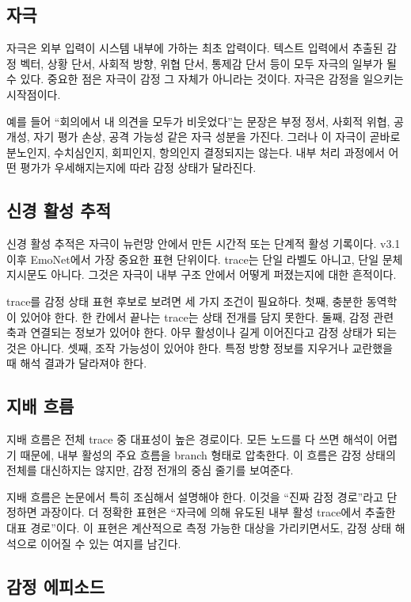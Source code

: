\documentclass[11pt,a4paper]{article}
\begin{document}
\subsection{자극}

자극은 외부 입력이 시스템 내부에 가하는 최초 압력이다. 텍스트 입력에서 추출된 감정 벡터, 상황 단서, 사회적 방향, 위협 단서, 통제감 단서 등이 모두 자극의 일부가 될 수 있다. 중요한 점은 자극이 감정 그 자체가 아니라는 것이다. 자극은 감정을 일으키는 시작점이다.

예를 들어 ``회의에서 내 의견을 모두가 비웃었다''는 문장은 부정 정서, 사회적 위협, 공개성, 자기 평가 손상, 공격 가능성 같은 자극 성분을 가진다. 그러나 이 자극이 곧바로 분노인지, 수치심인지, 회피인지, 항의인지 결정되지는 않는다. 내부 처리 과정에서 어떤 평가가 우세해지는지에 따라 감정 상태가 달라진다.

\subsection{신경 활성 추적}

신경 활성 추적은 자극이 뉴런망 안에서 만든 시간적 또는 단계적 활성 기록이다. v3.1 이후 EmoNet에서 가장 중요한 표현 단위이다. trace는 단일 라벨도 아니고, 단일 문체 지시문도 아니다. 그것은 자극이 내부 구조 안에서 어떻게 퍼졌는지에 대한 흔적이다.

trace를 감정 상태 표현 후보로 보려면 세 가지 조건이 필요하다. 첫째, 충분한 동역학이 있어야 한다. 한 칸에서 끝나는 trace는 상태 전개를 담지 못한다. 둘째, 감정 관련 축과 연결되는 정보가 있어야 한다. 아무 활성이나 길게 이어진다고 감정 상태가 되는 것은 아니다. 셋째, 조작 가능성이 있어야 한다. 특정 방향 정보를 지우거나 교란했을 때 해석 결과가 달라져야 한다.

\subsection{지배 흐름}

지배 흐름은 전체 trace 중 대표성이 높은 경로이다. 모든 노드를 다 쓰면 해석이 어렵기 때문에, 내부 활성의 주요 흐름을 branch 형태로 압축한다. 이 흐름은 감정 상태의 전체를 대신하지는 않지만, 감정 전개의 중심 줄기를 보여준다.

지배 흐름은 논문에서 특히 조심해서 설명해야 한다. 이것을 ``진짜 감정 경로''라고 단정하면 과장이다. 더 정확한 표현은 ``자극에 의해 유도된 내부 활성 trace에서 추출한 대표 경로''이다. 이 표현은 계산적으로 측정 가능한 대상을 가리키면서도, 감정 상태 해석으로 이어질 수 있는 여지를 남긴다.

\subsection{감정 에피소드}
\end{document}
